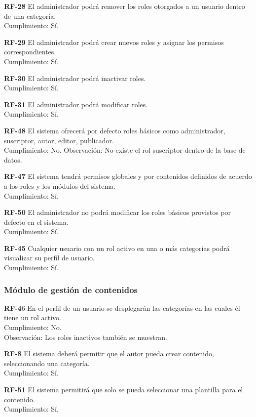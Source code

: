 \documentclass[10pt,times,twocolumn]{article}
\begin{document}
\noindent \textbf{RF-28} El administrador podrá remover los roles otorgados a un usuario dentro de  una categoría.\\
Cumplimiento: Sí.

\noindent \textbf{RF-29} El administrador podrá crear nuevos roles y asignar los permisos correspondientes.\\
Cumplimiento: Sí.

\noindent \textbf{RF-30} El administrador podrá inactivar roles.\\
Cumplimiento: Sí.

\noindent \textbf{RF-31} El administrador podrá modificar roles.\\
Cumplimiento: Sí.

\noindent \textbf{RF-48} El sistema ofrecerá por defecto roles básicos como administrador, suscriptor, autor, editor, publicador.\\
Cumplimiento: No. Observación: No existe el rol suscriptor dentro de la base de datos.

\noindent \textbf{RF-47} El sistema tendrá permisos globales y por contenidos definidos de acuerdo a los roles y los módulos del sistema.\\
Cumplimiento: Sí.

\noindent \textbf{RF-50} El administrador no podrá modificar los roles básicos provistos por defecto  en el sistema.\\
Cumplimiento: Sí.

\noindent \textbf{RF-45} Cualquier usuario con un rol activo en una o más categorías podrá visualizar su perfil de usuario.\\
Cumplimiento: Sí.

\subsubsection{Módulo de gestión de contenidos}

\noindent \textbf{RF-4}6 En el perfil de un usuario se desplegarán las categorías en las cuales él tiene un rol activo.\\
Cumplimiento: No.\\
Observación: Los roles inactivos también se muestran.

\noindent \textbf{RF-8} El sistema deberá permitir que  el autor pueda crear contenido, seleccionando una categoría.\\
Cumplimiento: Sí.

\noindent \textbf{RF-51} El sistema permitirá que solo se pueda seleccionar una plantilla para el contenido.\\
Cumplimiento: Sí.
\end{document}
